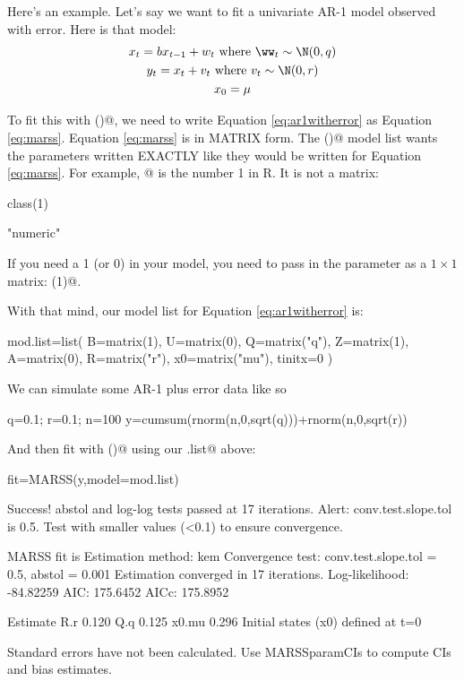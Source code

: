 Here's an example.  Let's say we want to fit a univariate AR-1 model observed with error. Here is that model:
\begin{equation}
\begin{gathered}
x_t = b x_{t-1} + w_t \text{ where } \ww_t \sim \N(0,q) \\
y_t = x_t+v_t \text{ where } v_t \sim \N(0,r) \\
x_0 = \mu
\end{gathered}   
\label{eq:ar1witherror}
\end{equation}

To fit this with \verb@MARSS()@, we need to write Equation \ref{eq:ar1witherror} as Equation \ref{eq:marss}.  Equation \ref{eq:marss} is in MATRIX form.  The \verb@MARSS()@ model list wants the parameters written EXACTLY like they would be written for Equation \ref{eq:marss}.  For example, @ is the number 1 in R.  It is not a matrix:
\begin{Schunk}
\begin{Sinput}
 class(1)
\end{Sinput}
\begin{Soutput}
[1] "numeric"
\end{Soutput}
\end{Schunk}
If you need a 1 (or 0) in your model, you need to pass in the parameter as a $1 \times 1$ matrix: \verb@matrix(1)@.

With that mind, our model list for Equation \ref{eq:ar1witherror} is:
\begin{Schunk}
\begin{Sinput}
 mod.list=list(
 B=matrix(1), U=matrix(0), Q=matrix("q"),
 Z=matrix(1), A=matrix(0), R=matrix("r"),
 x0=matrix("mu"), tinitx=0 )
\end{Sinput}
\end{Schunk}

We can simulate some AR-1 plus error data like so
\begin{Schunk}
\begin{Sinput}
 q=0.1; r=0.1; n=100
 y=cumsum(rnorm(n,0,sqrt(q)))+rnorm(n,0,sqrt(r))
\end{Sinput}
\end{Schunk}
And then fit with \verb@MARSS()@ using our \verb@mod.list@ above:
\begin{Schunk}
\begin{Sinput}
 fit=MARSS(y,model=mod.list)
\end{Sinput}
\begin{Soutput}
Success! abstol and log-log tests passed at 17 iterations.
Alert: conv.test.slope.tol is 0.5.
Test with smaller values (<0.1) to ensure convergence.

MARSS fit is
Estimation method: kem 
Convergence test: conv.test.slope.tol = 0.5, abstol = 0.001
Estimation converged in 17 iterations. 
Log-likelihood: -84.82259 
AIC: 175.6452   AICc: 175.8952   
 
      Estimate
R.r      0.120
Q.q      0.125
x0.mu    0.296
Initial states (x0) defined at t=0

Standard errors have not been calculated. 
Use MARSSparamCIs to compute CIs and bias estimates.
\end{Soutput}
\end{Schunk}

